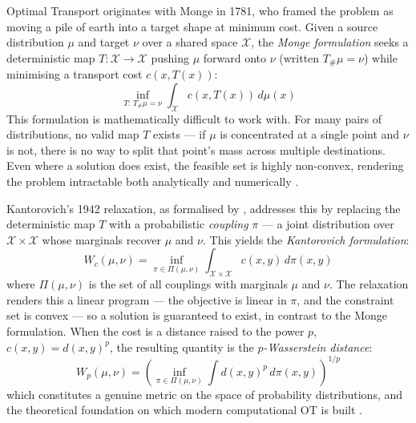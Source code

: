 Optimal Transport originates with Monge in 1781, who framed the problem as moving a pile of earth into a target shape at minimum cost. Given a source distribution $\mu$ and target $\nu$ over a shared space $\mathcal{X}$, the \emph{Monge formulation} seeks a deterministic map $T: \mathcal{X} \to \mathcal{X}$ pushing $\mu$ forward onto $\nu$ (written $T_\# \mu = \nu$) while minimising a transport cost $c(x, T(x))$:
\begin{equation}
    \inf_{T: \, T_\# \mu = \nu} \int_{\mathcal{X}} c(x, T(x)) \, d\mu(x)
    \label{eq:monge}
\end{equation}
This formulation is mathematically difficult to work with. For many pairs of distributions, no valid map $T$ exists --- if $\mu$ is concentrated at a single point and $\nu$ is not, there is no way to split that point's mass across multiple destinations. Even where a solution does exist, the feasible set is highly non-convex, rendering the problem intractable both analytically and numerically \parencite{villani2009optimal}.

Kantorovich's 1942 relaxation, as formalised by \textcite{villani2009optimal}, addresses this by replacing the deterministic map $T$ with a probabilistic \emph{coupling} $\pi$ --- a joint distribution over $\mathcal{X} \times \mathcal{X}$ whose marginals recover $\mu$ and $\nu$. This yields the \emph{Kantorovich formulation}:
\begin{equation}
    W_c(\mu, \nu) = \inf_{\pi \in \Pi(\mu, \nu)} \int_{\mathcal{X} \times \mathcal{X}} c(x, y) \, d\pi(x, y)
    \label{eq:kantorovich}
\end{equation}
where $\Pi(\mu, \nu)$ is the set of all couplings with marginals $\mu$ and $\nu$. The relaxation renders this a linear program --- the objective is linear in $\pi$, and the constraint set is convex --- so a solution is guaranteed to exist, in contrast to the Monge formulation. When the cost is a distance raised to the power $p$, $c(x,y) = d(x,y)^p$, the resulting quantity is the \emph{$p$-Wasserstein distance}:
\begin{equation}
    W_p(\mu, \nu) = \left( \inf_{\pi \in \Pi(\mu, \nu)} \int d(x,y)^p \, d\pi(x,y) \right)^{1/p}
    \label{eq:wasserstein}
\end{equation}
which constitutes a genuine metric on the space of probability distributions, and the theoretical foundation on which modern computational OT is built \parencite{peyre2019computational}.

